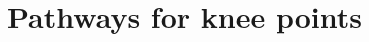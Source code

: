 \documentclass{article}
\newcommand{\cmark}{\textcolor{blue}{\textrm{\ding{52}}}}%
\begin{document}

    
        
    
    




\section{Pathways for knee points}
\end{document}
